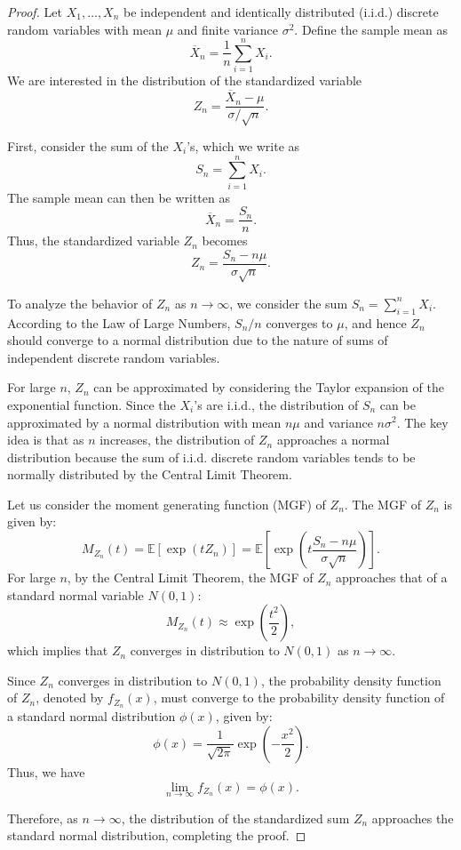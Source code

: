 \begin{proof}
Let $X_{1}, \ldots, X_{n}$ be independent and identically distributed (i.i.d.) discrete random variables with mean $\mu$ and finite variance $\sigma^2$. Define the sample mean as
\[
\overline{X}_n = \frac{1}{n} \sum_{i=1}^{n} X_i.
\]
We are interested in the distribution of the standardized variable
\[
Z_n = \frac{\overline{X}_n - \mu}{\sigma / \sqrt{n}}.
\]

First, consider the sum of the $X_i$'s, which we write as
\[
S_n = \sum_{i=1}^{n} X_i.
\]
The sample mean can then be written as
\[
\overline{X}_n = \frac{S_n}{n}.
\]
Thus, the standardized variable $Z_n$ becomes
\[
Z_n = \frac{S_n - n\mu}{\sigma\sqrt{n}}.
\]

To analyze the behavior of $Z_n$ as $n \to \infty$, we consider the sum $S_n = \sum_{i=1}^{n} X_i$. According to the Law of Large Numbers, $S_n/n$ converges to $\mu$, and hence $Z_n$ should converge to a normal distribution due to the nature of sums of independent discrete random variables.

For large $n$, $Z_n$ can be approximated by considering the Taylor expansion of the exponential function. Since the $X_i$'s are i.i.d., the distribution of $S_n$ can be approximated by a normal distribution with mean $n\mu$ and variance $n\sigma^2$. The key idea is that as $n$ increases, the distribution of $Z_n$ approaches a normal distribution because the sum of i.i.d. discrete random variables tends to be normally distributed by the Central Limit Theorem.

Let us consider the moment generating function (MGF) of $Z_n$. The MGF of $Z_n$ is given by:
\[
M_{Z_n}(t) = \mathbb{E}\left[\exp\left(t Z_n\right)\right] = \mathbb{E}\left[\exp\left(t \frac{S_n - n\mu}{\sigma\sqrt{n}}\right)\right].
\]
For large $n$, by the Central Limit Theorem, the MGF of $Z_n$ approaches that of a standard normal variable $N(0,1)$:
\[
M_{Z_n}(t) \approx \exp\left(\frac{t^2}{2}\right),
\]
which implies that $Z_n$ converges in distribution to $N(0,1)$ as $n \to \infty$.

Since $Z_n$ converges in distribution to $N(0,1)$, the probability density function of $Z_n$, denoted by $f_{Z_n}(x)$, must converge to the probability density function of a standard normal distribution $\phi(x)$, given by:
\[
\phi(x) = \frac{1}{\sqrt{2\pi}} \exp\left(-\frac{x^2}{2}\right).
\]
Thus, we have
\[
\lim_{n \rightarrow \infty} f_{Z_n}(x) = \phi(x).
\]

Therefore, as $n \to \infty$, the distribution of the standardized sum $Z_n$ approaches the standard normal distribution, completing the proof.
\end{proof}

